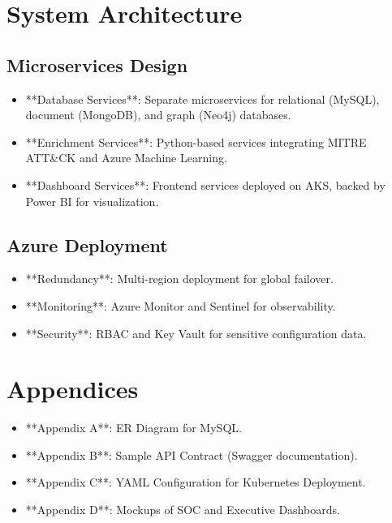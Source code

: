 \documentclass[12pt]{article}
\begin{document}
\newpage

\section{System Architecture}
\subsection{Microservices Design}
\begin{itemize}
    \item **Database Services**: Separate microservices for relational (MySQL), document (MongoDB), and graph (Neo4j) databases.
    \item **Enrichment Services**: Python-based services integrating MITRE ATT&CK and Azure Machine Learning.
    \item **Dashboard Services**: Frontend services deployed on AKS, backed by Power BI for visualization.
\end{itemize}

\subsection{Azure Deployment}
\begin{itemize}
    \item **Redundancy**: Multi-region deployment for global failover.
    \item **Monitoring**: Azure Monitor and Sentinel for observability.
    \item **Security**: RBAC and Key Vault for sensitive configuration data.
\end{itemize}

\section{Appendices}
\begin{itemize}
    \item **Appendix A**: ER Diagram for MySQL.
    \item **Appendix B**: Sample API Contract (Swagger documentation).
    \item **Appendix C**: YAML Configuration for Kubernetes Deployment.
    \item **Appendix D**: Mockups of SOC and Executive Dashboards.
\end{itemize}
\end{document}
